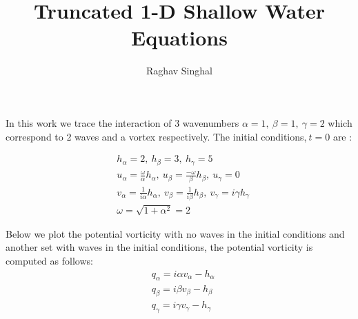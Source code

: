 \documentclass[12pt,twoside]{article}
\begin{document}
\title{Truncated 1-D Shallow Water Equations}


\author{Raghav Singhal}

\maketitle
In this work we trace the interaction of 3 wavenumbers  $\alpha=1 ,\  \beta=1 ,\ \gamma=2$ which correspond to 2 waves and a vortex respectively. The initial conditions,$ \ t=0$ are :

\begin{align}
&h_\alpha=2 , \ h_\beta=3, \ h_\gamma=5
\\
&u_\alpha=\frac{\omega}{\alpha}h_\alpha , \ u_\beta=\frac{-\omega}{\beta}h_\beta, \ u_\gamma=0
\\
&v_\alpha=\frac{1}{i \alpha}h_\alpha , \ v_\beta=\frac{1}{i \beta}h_\beta , \ v_\gamma=i \gamma h_\gamma
\\
&\omega=\sqrt{1+\alpha^2}=2
\end{align}

Below we plot the potential vorticity with no waves in the initial conditions and another set with waves in the initial conditions, the potential vorticity is computed as follows:
\begin{align}
&q_\alpha=i \alpha v_\alpha - h_\alpha
\\
&q_\beta=i \beta v_\beta - h_\beta
\\
&q_\gamma=i \gamma v_\gamma - h_\gamma
\end{align}
\end{document}
